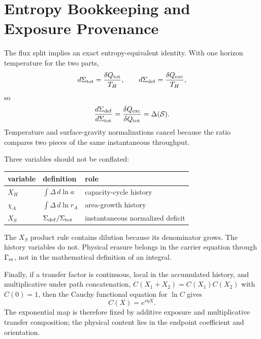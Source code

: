 \documentclass[aps,prd,twocolumn,10pt,superscriptaddress,nofootinbib]{revtex4-2}
\begin{document}
\section{Entropy Bookkeeping and Exposure Provenance}
\label{app:exposure_provenance}

The flux split implies an exact entropy-equivalent identity.  With one
horizon temperature for the two parts,
\begin{equation}
d\Sigma_{\rm tot}=\frac{\delta Q_{\rm tot}}{T_H},
\qquad
d\Sigma_{\rm def}=\frac{\delta Q_{\rm exc}}{T_H},
\end{equation}
so
\begin{equation}
\frac{d\Sigma_{\rm def}}{d\Sigma_{\rm tot}}
=\frac{\delta Q_{\rm exc}}{\delta Q_{\rm tot}}
=\Delta(\mathcal S).
\label{eq:app_entropy_identity}
\end{equation}
Temperature and surface-gravity normalizations cancel because the ratio
compares two pieces of the same instantaneous throughput.

Three variables should not be conflated:
\begin{center}
\begin{tabular}{p{}p{}p{}}
\toprule
variable & definition & role \\
\midrule
$X_H$ & $\int\Delta\,d\ln a$ & capacity-cycle history \\
$\chi_A$ & $\int\Delta\,d\ln r_A$ & area-growth history \\
$X_S$ & $\Sigma_{\rm def}/\Sigma_{\rm tot}$ & instantaneous normalized deficit \\
\bottomrule
\end{tabular}
\end{center}
The $X_S$ product rule contains dilution because its denominator grows.  The
history variables do not.  Physical erasure belongs in the carrier equation
through $\Gamma_{\rm er}$, not in the mathematical definition of an integral.

Finally, if a transfer factor is continuous, local in the accumulated
history, and multiplicative under path concatenation,
$C(X_1+X_2)=C(X_1)C(X_2)$ with $C(0)=1$, then the Cauchy functional equation
for $\ln C$ gives
\begin{equation}
C(X)=e^{s\eta X}.
\end{equation}
The exponential map is therefore fixed by additive exposure and
multiplicative transfer composition; the physical content lies in the
endpoint coefficient and orientation.
\end{document}

